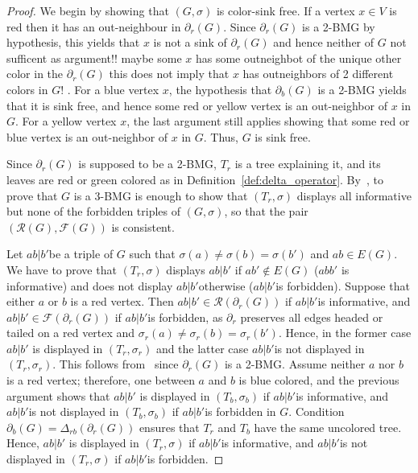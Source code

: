 \documentclass[final,3p,times]{elsarticle}
\newcommand{\TODO}[1]{\begingroup\color{red}#1\endgroup}
\begin{document}
\begin{proof}
We begin by showing that $(G,\sigma)$ is color-sink free. If a vertex $x\in V$ is red then it has an out-neighbour in $\partial_{r}(G)$. Since $\partial_{r}(G)$ is a 2-BMG by hypothesis, this yields that $x$ is not a sink of $\partial_{r}(G)$ and hence neither of $G$
\TODO{not sufficent as argument!! maybe some $x$ has some outneighbot of the unique other color in the $\partial_{r}(G)$ this does not imply that $x$ has outneighbors of 2 different colors in $G$!}
. For a blue vertex $x$, the hypothesis that $\partial_b(G)$ is a 2-BMG yields that it is sink free, and hence some red or yellow vertex is an out-neighbor of $x$ in $G$. For a yellow vertex $x$, the last argument still applies showing that some red or blue vertex is an out-neighbor of $x$ in $G$. Thus, $G$ is sink free.

Since $\partial_{r}(G)$ is supposed to be a 2-BMG, $T_r$ is a tree explaining it, and its leaves are red or green colored as in Definition~\ref{def:delta_operator}. By~\cite[Proposition~2.3]{korchmaros2021quasi}, to prove that $G$ is a 3-BMG is enough to show that $(T_r,\sigma)$ displays all informative but none of the forbidden triples of $(G,\sigma)$, so that the pair $(\mathscr{R}(G),\mathscr{F}(G))$ is consistent.

Let $ab|b'$be a triple of $G$ such that $\sigma(a)\ne \sigma(b)=\sigma(b')$ and $ab\in E(G)$. We have to prove that $(T_r,\sigma)$ displays $ab|b'$ if $ab'\notin E(G)$ ($ abb'$ is informative) and does not display $ab|b'$otherwise ($ab|b'$is forbidden). Suppose that either $a$ or $b$ is a red vertex. Then $ab|b'\in \mathscr{R}(\partial_{r}(G))$ if $ab|b'$is informative, and $ab|b'\in \mathscr{F}(\partial_{r}(G))$ if $ab|b'$is forbidden, as $\partial_{r}$ preserves all edges headed or tailed on a red vertex and $\sigma_r(a)\ne \sigma_r(b)=\sigma_r(b')$. Hence, in the former case $ab|b'$ is displayed in $(T_r,\sigma_r)$ and the latter case $ab|b'$is not displayed in $(T_r,\sigma_r)$. This follows from~\cite[Proposition~2.3]{korchmaros2021quasi} since $\partial_{r}(G)$ is a 2-BMG. Assume neither $a$ nor $b$ is a red vertex; therefore, one between $a$ and $b$ is blue colored, and the previous argument shows that $ab|b'$ is displayed in $(T_b,\sigma_b)$ if $ab|b'$is informative, and $ab|b'$is not displayed in $(T_b,\sigma_b)$ if $ab|b'$is forbidden in $G$. Condition $\partial_b(G)=\Delta_{rb}(\partial_r(G))$ ensures that $T_r$ and $T_b$ have the same uncolored tree. Hence, $ab|b'$ is displayed in $(T_r,\sigma)$ if $ab|b'$is informative, and $ab|b'$is not displayed in $(T_r,\sigma)$ if $ab|b'$is forbidden.
\end{proof}
\end{document}
